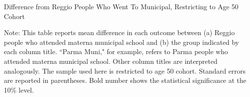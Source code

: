 \documentclass[11pt]{article}
\begin{document}
\begin{table}[H]
\begin{center}
	\caption{Difference from Reggio People Who Went To Municipal, Restricting to Age 50 Cohort}
	\scalebox{0.83}{
		}
\end{center}
\footnotesize
Note: This table reports mean difference in each outcome between (a) Reggio people who attended materna municipal school and (b) the group indicated by each column title. ``Parma Muni," for example, refers to Parma people who attended materna municipal school. Other column titles are interpreted analogously. The sample used here is restricted to age 50 cohort. Standard errors are reported in parentheses. Bold number shows the statistical significance at the 10\% level. 
\end{table}
\end{document}
